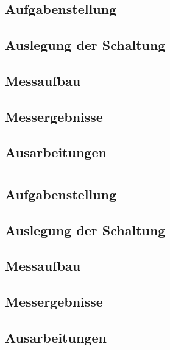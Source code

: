 	\section{}
		\subsection{Aufgabenstellung}

		\subsection{Auslegung der Schaltung}

		\subsection{Messaufbau}

		\subsection{Messergebnisse}

		\subsection{Ausarbeitungen}

		
	\section{}
		\subsection{Aufgabenstellung}

		\subsection{Auslegung der Schaltung}

		\subsection{Messaufbau}

		\subsection{Messergebnisse}

		\subsection{Ausarbeitungen}
		